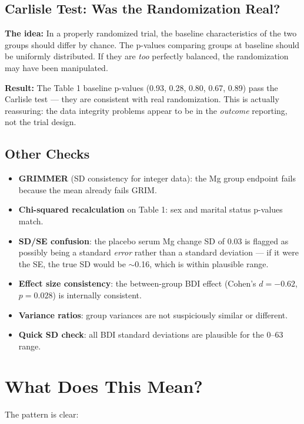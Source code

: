 \documentclass[11pt]{article}
\begin{document}
\subsection{Carlisle Test: Was the Randomization Real?}

\textbf{The idea:} In a properly randomized trial, the baseline characteristics of the two groups should differ by chance. The p-values comparing groups at baseline should be uniformly distributed. If they are \textit{too} perfectly balanced, the randomization may have been manipulated.

\textbf{Result:} The Table 1 baseline p-values (0.93, 0.28, 0.80, 0.67, 0.89) pass the Carlisle test --- they are consistent with real randomization. This is actually reassuring: the data integrity problems appear to be in the \textit{outcome} reporting, not the trial design.

\subsection{Other Checks}

\begin{itemize}[nosep]
\item \textbf{GRIMMER} (SD consistency for integer data): the Mg group endpoint fails because the mean already fails GRIM.
\item \textbf{Chi-squared recalculation} on Table 1: sex and marital status p-values match.
\item \textbf{SD/SE confusion}: the placebo serum Mg change SD of 0.03 is flagged as possibly being a standard \textit{error} rather than a standard deviation --- if it were the SE, the true SD would be $\sim$0.16, which is within plausible range.
\item \textbf{Effect size consistency}: the between-group BDI effect (Cohen's $d = -0.62$, $p = 0.028$) is internally consistent.
\item \textbf{Variance ratios}: group variances are not suspiciously similar or different.
\item \textbf{Quick SD check}: all BDI standard deviations are plausible for the 0--63 range.
\end{itemize}

\section{What Does This Mean?}

The pattern is clear:
\end{document}
